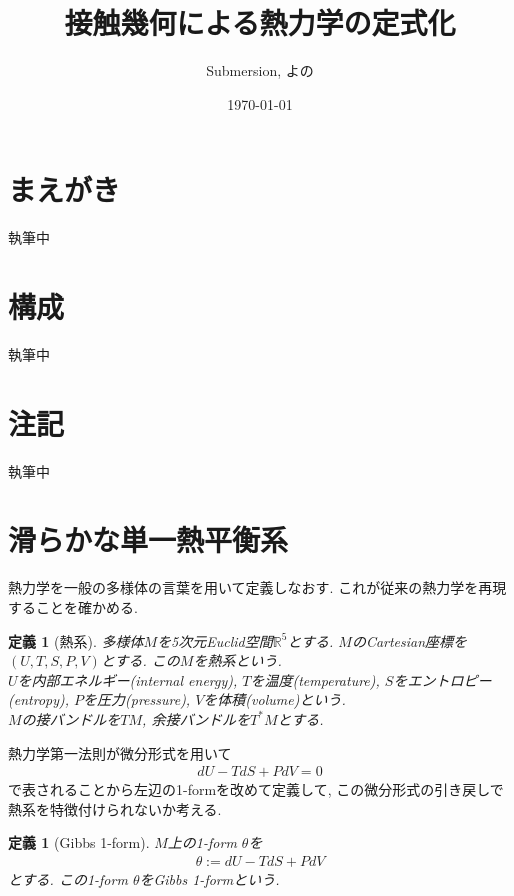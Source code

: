 \documentclass[a4paper,12pt]{ltjsarticle}
\title{接触幾何による熱力学の定式化}
\author{Submersion, よの}
\date{\today}
\theoremstyle{break}
\newtheorem{defn}[thm]{定義}
\newcommand{\mbr}{\mathbb{R}}
\numberwithin{equation}{section}
\begin{document}
\maketitle

\newpage

\section*{まえがき}

執筆中

\section*{構成}

執筆中

\section*{注記}

執筆中

\newpage

\tableofcontents

\newpage

\section{滑らかな単一熱平衡系}

熱力学を一般の多様体の言葉を用いて定義しなおす. 
これが従来の熱力学を再現することを確かめる. 

\begin{defn}[熱系]
  多様体$M$を5次元Euclid空間$\mbr^5$とする. 
  $M$のCartesian座標を$(U,T,S,P,V)$とする. 
  この$M$を熱系という. \\
  $U$を内部エネルギー(internal energy), $T$を温度(temperature), $S$をエントロピー(entropy), $P$を圧力(pressure), $V$を体積(volume)という. \\
  $M$の接バンドルを$TM$, 余接バンドルを$T^*M$とする. 
\end{defn}

熱力学第一法則が微分形式を用いて
\begin{align*}
  dU - TdS + PdV 
  = 0
\end{align*}
で表されることから左辺の1-formを改めて定義して, この微分形式の引き戻しで熱系を特徴付けられないか考える. 

\begin{defn}[Gibbs 1-form]
  $M$上の1-form $\theta$を
  \begin{align}
    \label{gibbs}
    \theta 
    := dU - TdS + PdV
  \end{align}
  とする. 
  この1-form $\theta$をGibbs 1-formという. 
\end{defn}
\end{document}
